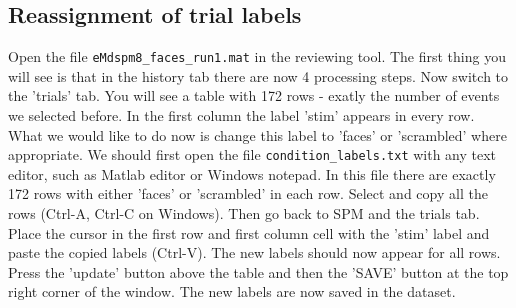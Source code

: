 \subsection{Reassignment of trial labels}
Open the file \texttt{eMdspm8\_faces_run1.mat} in the reviewing tool. The first thing you will see is that in the history tab there are now 4 processing steps. Now switch to the 'trials' tab. You will see a table with 172 rows - exatly the number of events we selected before. In the first column the label 'stim' appears in every row. What we would like to do now is change this label to 'faces' or 'scrambled' where appropriate. We should first open the file \verb!condition_labels.txt! with any text editor, such as Matlab editor or Windows notepad. In this file there are exactly 172 rows with either 'faces' or 'scrambled' in each row. Select and copy all the rows (Ctrl-A, Ctrl-C on Windows). Then go back to SPM and the trials tab. Place the cursor in the first row and first column cell with the 'stim' label and paste the copied labels (Ctrl-V). The new labels should now appear for all rows. Press the 'update' button above the table and then the 'SAVE' button at the top right corner of the window. The new labels are now saved in the dataset.  


